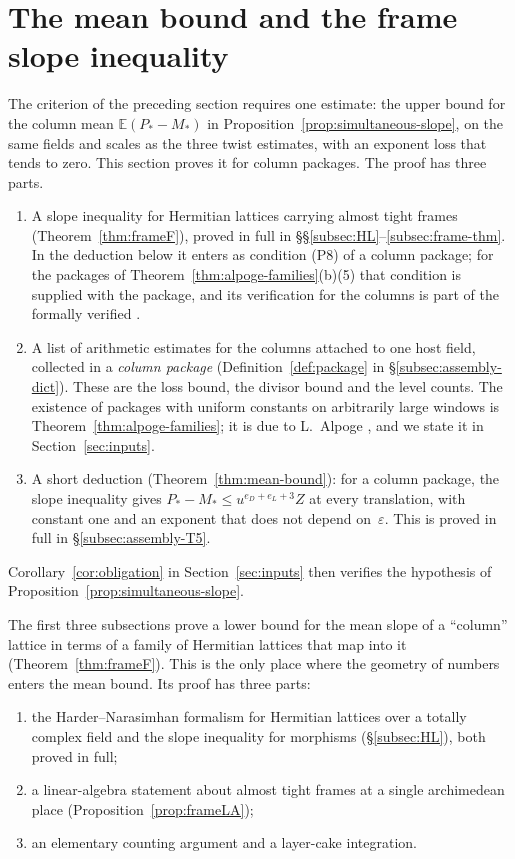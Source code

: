 \documentclass[10pt]{amsart}
\theoremstyle{definition}
\theoremstyle{remark}
\begin{document}
\section{The mean bound and the frame slope inequality}\label{sec:meanbound}
The criterion of the preceding section requires one estimate: the upper
bound for the column mean $\mathbb E(P_*-M_*)$ in
Proposition~\ref{prop:simultaneous-slope}, on the same fields and scales as
the three twist estimates, with an exponent loss that tends to zero. This
section proves it for column packages. The proof has three parts.
\begin{enumerate}
\item A slope inequality for Hermitian lattices carrying almost tight
frames (Theorem~\ref{thm:frameF}), proved in full in
\S\S\ref{subsec:HL}--\ref{subsec:frame-thm}. In the deduction below it
enters as condition (P8) of a column package; for the packages of
Theorem~\ref{thm:alpoge-families}(b)(5) that condition is supplied with the
package, and its verification for the columns is part of the formally
verified \cite[Proposition~\ref{A-i4:Lprop-fam}(b)]{Annex}.
\item A list of arithmetic estimates for the columns attached to one host
field, collected in a \emph{column package} (Definition~\ref{def:package}
in \S\ref{subsec:assembly-dict}). These are the loss bound, the divisor
bound and the level counts. The existence of packages with uniform
constants on arbitrarily large windows is Theorem~\ref{thm:alpoge-families};
it is due to L.~Alpoge \cite{CharacterFamily}, and we state it in
Section~\ref{sec:inputs}.
\item A short deduction (Theorem~\ref{thm:mean-bound}): for a column
package, the slope inequality gives
$P_*-M_*\le u^{e_D+e_L+3}Z$ at every translation, with constant one and an
exponent that does not depend on~$\varepsilon$. This is proved in full in
\S\ref{subsec:assembly-T5}.
\end{enumerate}
Corollary~\ref{cor:obligation} in Section~\ref{sec:inputs} then verifies the
hypothesis of Proposition~\ref{prop:simultaneous-slope}.


The first three subsections prove a lower bound for the mean slope of a ``column'' lattice in terms of a family of Hermitian lattices that map into it (Theorem~\ref{thm:frameF}). This is the only place where the geometry of numbers enters the mean bound. Its proof has three parts:
\begin{enumerate}
\item the Harder--Narasimhan formalism for Hermitian lattices over a totally complex field and the slope inequality for morphisms (\S\ref{subsec:HL}), both proved in full;
\item a linear-algebra statement about almost tight frames at a single archimedean place (Proposition~\ref{prop:frameLA});
\item an elementary counting argument and a layer-cake integration.
\end{enumerate}
\end{document}
